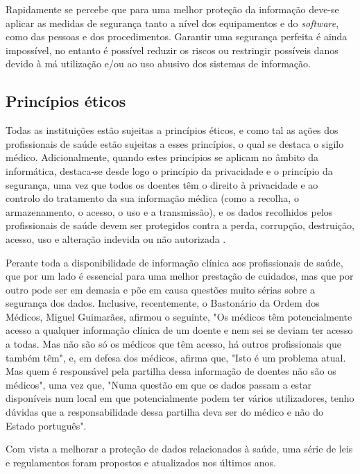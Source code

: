 \documentclass[conference]{IEEEtran}
\begin{document}
Rapidamente se percebe que para uma melhor proteção da informação deve-se aplicar as medidas de segurança tanto a nível dos equipamentos e do \textit{software}, como das pessoas e dos procedimentos. Garantir uma segurança perfeita é ainda impossível, no entanto é possível reduzir os riscos ou restringir possíveis danos devido à má utilização e/ou ao uso abusivo dos sistemas de informação.


\subsection{Princípios éticos}

Todas as instituições estão sujeitas a princípios éticos, e como tal as ações dos profissionais de saúde estão sujeitas a esses princípios, o qual se destaca o sigilo médico. Adicionalmente, quando estes princípios se aplicam no âmbito da informática, destaca-se desde logo o princípio da privacidade e o princípio da segurança, uma vez que todos os doentes têm o direito à privacidade e ao controlo do tratamento da sua informação médica (como a recolha, o armazenamento, o acesso, o uso e a transmissão), e os dados recolhidos pelos profissionais de saúde devem ser protegidos contra a perda, corrupção, destruição, acesso, uso e alteração indevida ou não autorizada \cite{segurancaSI}.

Perante toda a disponibilidade de informação clínica aos profissionais de saúde, que por um lado é essencial para uma melhor prestação de cuidados, mas que por outro pode ser em demasia e põe em causa questões muito sérias sobre a segurança dos dados. Inclusive, recentemente, o Bastonário da Ordem dos Médicos, Miguel Guimarães, afirmou o seguinte, "Os médicos têm potencialmente acesso a qualquer informação clínica de um doente e nem sei se deviam ter acesso a todas. Mas não são só os médicos que têm acesso, há outros profissionais que também têm", e, em defesa dos médicos, afirma que, "Isto é um problema atual. Mas quem é responsável pela partilha dessa informação de doentes não são os médicos", uma vez que, "Numa questão em que os dados passam a estar disponíveis num local em que potencialmente podem ter vários utilizadores, tenho dúvidas que a responsabilidade dessa partilha deva ser do médico e não do Estado português".

Com vista a melhorar a proteção de dados relacionados à saúde, uma série de leis e regulamentos foram propostos e atualizados nos últimos anos.
\end{document}
